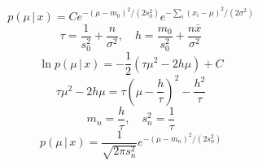\documentclass{article}
\begin{document}
\[
p(\mu\,|\, x)=C e^{-(\mu-m_0)^2/(2s_0^2)}e^{-\sum_i(x_i-\mu)^2/(2\sigma^2)}
\]
\[
\tau=\frac{1}{s_0^2}+\frac{n}{\sigma^2},\quad h=\frac{m_0}{s_0^2}+\frac{n\bar x}{\sigma^2}
\]
\[
\ln p(\mu\,|\, x)=-\frac{1}{2}(\tau\mu^2-2h\mu)+C
\]
\[
\tau\mu^2-2h\mu=\tau\left(\mu-\frac{h}{\tau}\right)^2-\frac{h^2}{\tau}
\]
\[
m_n=\frac{h}{\tau},\quad s_n^2=\frac{1}{\tau}
\]
\[
p(\mu\,|\, x)=\frac{1}{\sqrt{2\pi s_n^2}}e^{-(\mu-m_n)^2/(2s_n^2)}
\]
\end{document}
